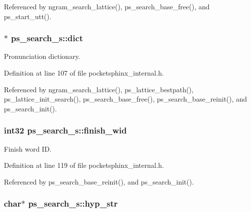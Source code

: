 Referenced by ngram\+\_\+search\+\_\+lattice(), ps\+\_\+search\+\_\+base\+\_\+free(), and ps\+\_\+start\+\_\+utt().

\subsubsection[{dict}]{$\ast$ ps\+\_\+search\+\_\+s\+::dict}\label{structps__search__s_a918f243fa966e72c47f697fb9e60089d}


Pronunciation dictionary. 



Definition at line 107 of file pocketsphinx\+\_\+internal.\+h.



Referenced by ngram\+\_\+search\+\_\+lattice(), ps\+\_\+lattice\+\_\+bestpath(), ps\+\_\+lattice\+\_\+init\+\_\+search(), ps\+\_\+search\+\_\+base\+\_\+free(), ps\+\_\+search\+\_\+base\+\_\+reinit(), and ps\+\_\+search\+\_\+init().

\subsubsection[{finish\+\_\+wid}]{\setlength{\rightskip}{0pt plus 5cm}int32 ps\+\_\+search\+\_\+s\+::finish\+\_\+wid}\label{structps__search__s_a0fb4d79f1084bdbbc0a808513f7c1ca7}


Finish word I\+D. 



Definition at line 119 of file pocketsphinx\+\_\+internal.\+h.



Referenced by ps\+\_\+search\+\_\+base\+\_\+reinit(), and ps\+\_\+search\+\_\+init().

\subsubsection[{hyp\+\_\+str}]{\setlength{\rightskip}{0pt plus 5cm}char$\ast$ ps\+\_\+search\+\_\+s\+::hyp\+\_\+str}\label{structps__search__s_aa398c736a887af97e42b2a562359adc3}



